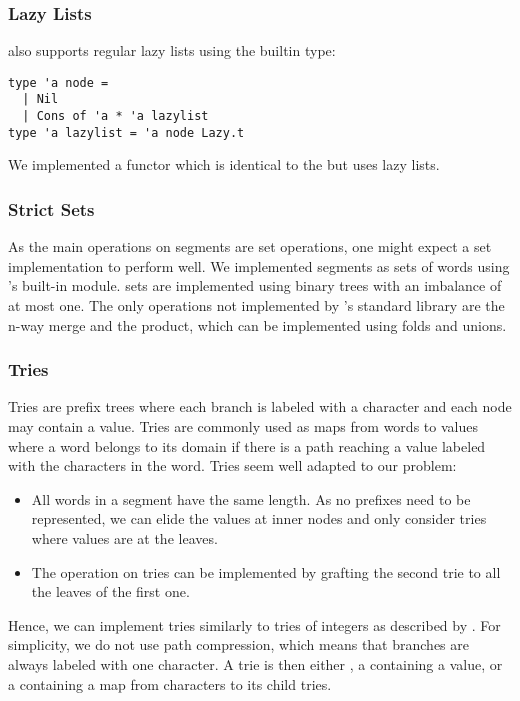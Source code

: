 \subsubsection{Lazy Lists}

\ocaml also supports regular lazy lists using the builtin  type:

\begin{lstlisting}
type 'a node =
  | Nil
  | Cons of 'a * 'a lazylist
type 'a lazylist = 'a node Lazy.t
\end{lstlisting}

We implemented a  functor which is identical to the
 but uses lazy lists.

\subsubsection{Strict Sets}

As the main operations on segments are set operations, one might 
expect a set implementation to perform well. We implemented segments as sets
of words using \ocaml's built-in  module. \ocaml sets are implemented
using binary trees with an imbalance of at most one.
The only operations not implemented by \ocaml's standard library are
the n-way merge and the product, which can be implemented using folds and unions.

\subsubsection{Tries}

Tries \cite{Fredkin1960} are prefix trees where each branch is labeled
with a character and each node may contain a value. Tries are commonly used
as maps from words to values where a word belongs to its domain if there is a
path reaching a value labeled with the characters in the word.
Tries seem well adapted to our problem:
\begin{itemize}[leftmargin=*]
\item All words in a segment have the same length. As no prefixes need
  to be represented, we can elide the values at inner nodes and only consider
  tries
  where values are at the leaves.
\item The  operation on tries can be implemented by
  grafting the second trie to all the leaves of the first one.
\end{itemize}

Hence, we can implement tries similarly to tries of integers as described
by \citet{Okasaki98fastmergeable}.
For simplicity, we do not use path compression, which means
that branches are always labeled with one character.
A trie is then either , a  containing a value, or a  containing a map from characters
to its child tries.

